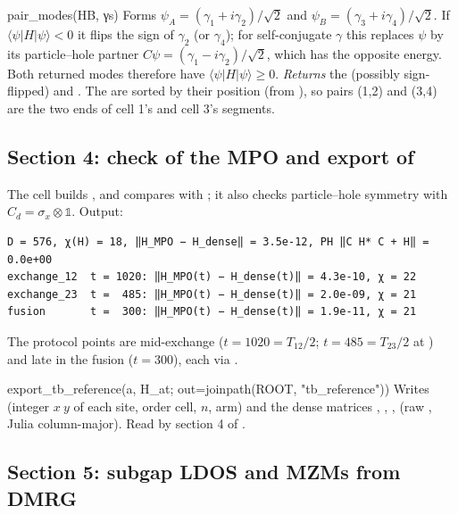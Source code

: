 \begin{function}{pair\_modes(HB, γs)}
Forms $\psi_A = (\gamma_1 + i\gamma_2)/\sqrt2$ and $\psi_B = (\gamma_3+i\gamma_4)/\sqrt2$. If $\langle\psi|H|\psi\rangle < 0$ it flips the sign of
$\gamma_2$ (or $\gamma_4$); for self-conjugate $\gamma$ this replaces $\psi$ by its particle--hole partner $C\psi = (\gamma_1 - i\gamma_2)/\sqrt2$,
which has the opposite energy. Both returned modes therefore have
$\langle\psi|H|\psi\rangle\ge0$. \emph{Returns} the (possibly sign-flipped)  and \code{[ψ\_A, ψ\_B]}. The  are sorted by
their position (from ), so pairs (1,2) and (3,4) are the two ends of cell 1's and cell 3's segments.
\end{function}

\subsection{Section 4: check of the MPO and export of }

The cell builds ,  and compares with
; it also checks particle--hole symmetry with $C_d = \sigma_x\otimes\mathbb1$. Output:

\begin{Verbatim}
D = 576, χ(H) = 18, ‖H_MPO − H_dense‖ = 3.5e-12, PH ‖C H* C + H‖ = 0.0e+00
exchange_12  t = 1020: ‖H_MPO(t) − H_dense(t)‖ = 4.3e-10, χ = 22
exchange_23  t =  485: ‖H_MPO(t) − H_dense(t)‖ = 2.0e-09, χ = 21
fusion       t =  300: ‖H_MPO(t) − H_dense(t)‖ = 1.9e-11, χ = 21
\end{Verbatim}
The protocol points are mid-exchange ($t = 1020 = T_{12}/2$; $t = 485 = T_{23}/2$ at ) and late in the fusion ($t = 300$),
each via .

\begin{function}{export\_tb\_reference(a, H\_at; out=joinpath(ROOT, "tb\_reference"))}
Writes  (integer $x\ y$ of each site, order cell, $n$, arm) and the dense matrices ,
, ,  (raw , Julia column-major). Read by section 4 of
.
\end{function}

\subsection{Section 5: subgap LDOS and MZMs from DMRG}


